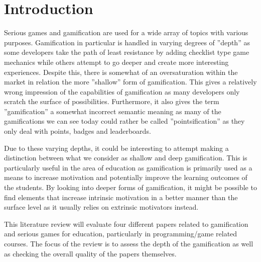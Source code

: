 \section{Introduction}
Serious games and gamification are used for a wide array of topics with various purposes. Gamification in particular is handled in varying degrees of ''depth'' as some developers take the path of least resistance by adding checklist type game mechanics while others attempt to go deeper and create more interesting experiences. Despite this, there is somewhat of an oversaturation within the market in relation the more ''shallow'' form of gamification. This gives a relatively wrong impression of the capabilities of gamification as many developers only scratch the surface of possibilities. Furthermore, it also gives the term ''gamification'' a somewhat incorrect semantic meaning as many of the gamifications we can see today could rather be called ''pointsification'' as they only deal with points, badges and leaderboards. 

Due to these varying depths, it could be interesting to attempt making a distinction between what we consider as shallow and deep gamification. This is particularly useful in the area of education as gamification is primarily used as a means to increase motivation and potentially improve the learning outcomes of the students. By looking into deeper forms of gamification, it might be possible to find elements that increase intrinsic motivation in a better manner than the surface level as it usually relies on extrinsic motivators instead. 


This literature review will evaluate four different papers related to gamification and serious games for education, particularly in programming/game related courses. The focus of the review is to assess the depth of the gamification as well as checking the overall quality of the papers themselves. 